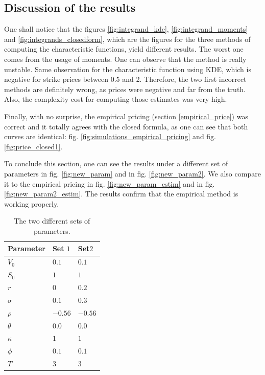 \subsection{Discussion of the results}
\label{comparaison_integrands}
One shall notice that the figures \ref{fig:integrand_kde}, \ref{fig:integrand_moments} and \ref{fig:integrands_closedform}, which are the figures for the three methods of computing the characteristic functions, yield different results. The worst one comes from the usage of moments. One can observe that the method is really unstable. Same observation for the characteristic function using KDE, which is negative for strike prices between 0.5 and 2.
\label{comparaison_price}
Therefore, the two first incorrect methods are definitely wrong, as prices were negative and far from the truth. Also, the complexity cost for computing those estimates was very high.

Finally, with no surprise, the empirical pricing (section \ref{empirical_price}) was correct and it totally agrees with the closed formula, as one can see that both curves are identical: fig. \ref{fig:simulations_empirical_pricing} and fig. \ref{fig:price_closed1}.


To conclude this section, one can see the results under a different set of parameters in fig. \ref{fig:new_param} and in fig. \ref{fig:new_param2}. We also compare it to the empirical pricing in fig. \ref{fig:new_param_estim} and in fig. \ref{fig:new_param2_estim}. The results confirm that the empirical method is working properly.


\begin{table}
\begin{center}
\begin{tabular}{   m{4.5 cm} | m{4.5 cm} | m{4.5 cm}   } 
\hline
 Parameter & Set $1$ & Set$ 2$ \\ 
\hline
\hline
$V_0$ & $0.1$ & $0.1$ \\
\hline
$S_0$ & $1$ & $1$ \\
\hline
$r$ & $0$ & $0.2$ \\
\hline
$\sigma$ & $0.1$ & $0.3$ \\
\hline
$\rho$ &$ -0.56$ &  $-0.56$\\
\hline
$\theta$  &  $0.0$ &$ 0.0$ \\
\hline
$\kappa$ & $1$ & $1$ \\
\hline
$\phi$ & $0.1$ &  $0.1$ \\
\hline
$T$ & $3$ &  $3$ \\
\hline
\end{tabular}
\caption{The two different sets of parameters.}
\label{table:parameters_for_closed_form}
\end{center}
\end{table}


